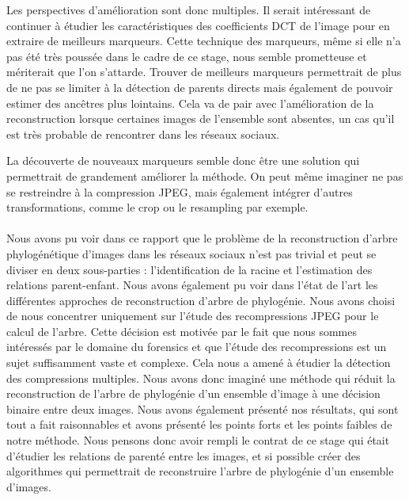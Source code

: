 \documentclass[utf8,final]{stageM2R} %
\begin{document}
Les perspectives d'amélioration sont donc multiples. Il serait intéressant de continuer à étudier les caractéristiques des coefficients DCT de l'image pour en extraire de meilleurs marqueurs. Cette technique des marqueurs, même si elle n'a pas été très poussée dans le cadre de ce stage, nous semble prometteuse et mériterait que l'on s'attarde. Trouver de meilleurs marqueurs permettrait de plus de ne pas se limiter à la détection de parents directs mais également de pouvoir estimer des ancêtres plus lointains. Cela va de pair avec l'amélioration de la reconstruction lorsque certaines images de l'ensemble sont absentes, un cas qu'il est très probable de rencontrer dans les réseaux sociaux. 

La découverte de nouveaux marqueurs semble donc être une solution qui permettrait de grandement améliorer la méthode. On peut même imaginer ne pas se restreindre à la compression JPEG, mais également intégrer d'autres transformations, comme le crop ou le resampling par exemple.
\paragraph{}

Nous avons pu voir dans ce rapport que le problème de la reconstruction d'arbre phylogénétique d'images dans les réseaux sociaux n'est pas trivial et peut se diviser en deux sous-parties : l'identification de la racine et l'estimation des relations parent-enfant. Nous avons également pu voir dans l'état de l'art les différentes approches de reconstruction d'arbre de phylogénie. Nous avons choisi de nous concentrer uniquement sur l'étude des recompressions JPEG pour le calcul de l'arbre. Cette décision est motivée par le fait que nous sommes intéressés par le domaine du forensics et que l'étude des recompressions est un sujet suffisamment vaste et complexe. Cela nous a amené à étudier la détection des compressions multiples. Nous avons donc imaginé une méthode qui réduit la reconstruction de l'arbre de phylogénie d'un ensemble d'image à une décision binaire entre deux images. Nous avons également présenté nos résultats, qui sont tout a fait raisonnables et avons présenté les points forts et les points faibles de notre méthode. Nous pensons donc avoir rempli le contrat de ce stage qui était d'étudier les relations de parenté entre les images, et si possible créer des algorithmes qui permettrait de reconstruire l'arbre de phylogénie d'un ensemble d'images.

\printbibliography
\end{document}
